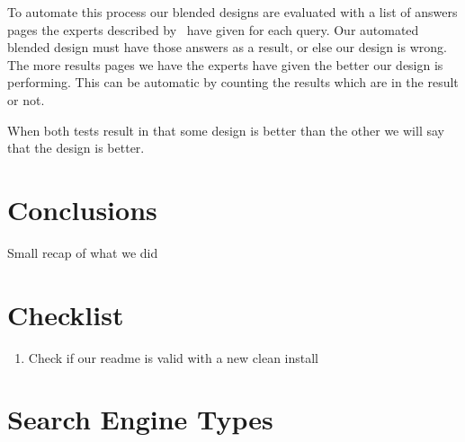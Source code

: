 \documentclass[12pt]{article}
\begin{document}
To automate this process our blended designs are evaluated with a list of answers pages the experts described by~\cite{lalmas2011aggregated} have given for each query. Our automated blended design must have those answers as a result, or else our design is wrong. The more results pages we have the experts have given the better our design is performing. This can be automatic by counting the results which are in the result or not. 

When both tests result in that some design is better than the other we will say that the design is better. %

\section{Conclusions}
\label{sec:conclusion}
Small recap of what we did

\section{Checklist}
\begin{enumerate}
\item Check if our readme is valid with a new clean install
\end{enumerate}




\appendix
\section{Search Engine Types}
\label{app:enginetypes}

\end{document}
